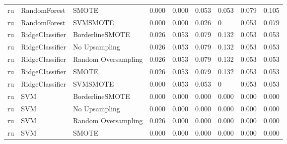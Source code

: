 \begin{tabular}{lllllllll}
      ru &                 RandomForest &               SMOTE & 0.000 &                     0.000 &                 0.053 &                  0.053 &                                   0.079 &     0.105 \\
      ru &                 RandomForest &            SVMSMOTE & 0.000 &                     0.000 &                 0.026 &                      0 &                                   0.053 &     0.079 \\
      ru &              RidgeClassifier &     BorderlineSMOTE & 0.026 &                     0.053 &                 0.079 &                  0.132 &                                   0.053 &     0.053 \\
      ru &              RidgeClassifier &       No Upsampling & 0.026 &                     0.053 &                 0.079 &                  0.132 &                                   0.053 &     0.053 \\
      ru &              RidgeClassifier & Random Oversampling & 0.026 &                     0.053 &                 0.079 &                  0.132 &                                   0.053 &     0.053 \\
      ru &              RidgeClassifier &               SMOTE & 0.026 &                     0.053 &                 0.079 &                  0.132 &                                   0.053 &     0.053 \\
      ru &              RidgeClassifier &            SVMSMOTE & 0.000 &                     0.053 &                 0.053 &                      0 &                                   0.053 &     0.053 \\
      ru &                          SVM &     BorderlineSMOTE & 0.000 &                     0.000 &                 0.000 &                  0.000 &                                   0.000 &     0.000 \\
      ru &                          SVM &       No Upsampling & 0.000 &                     0.000 &                 0.000 &                  0.000 &                                   0.000 &     0.000 \\
      ru &                          SVM & Random Oversampling & 0.026 &                     0.000 &                 0.000 &                  0.000 &                                   0.000 &     0.000 \\
      ru &                          SVM &               SMOTE & 0.000 &                     0.000 &                 0.000 &                  0.000 &                                   0.000 &     0.000 \\

\end{tabular}

